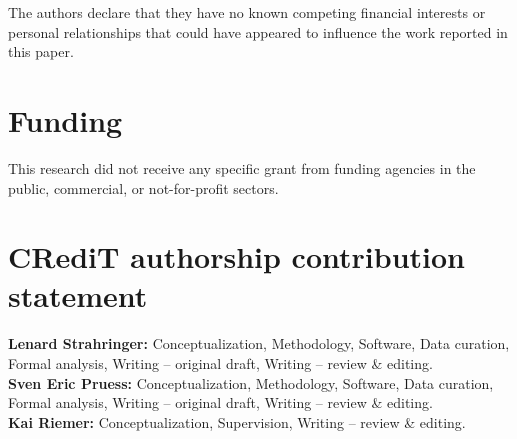 \documentclass[12pt]{article}
\begin{document}
The authors declare that they have no known competing financial interests or personal relationships that could have appeared to influence the work reported in this paper.

\section*{Funding}

This research did not receive any specific grant from funding agencies in the public, commercial, or not-for-profit sectors.

\section*{CRediT authorship contribution statement}

\textbf{Lenard Strahringer:} Conceptualization, Methodology, Software, Data curation, Formal analysis, Writing -- original draft, Writing -- review \& editing. \\
\textbf{Sven Eric Pruess:} Conceptualization, Methodology, Software, Data curation, Formal analysis, Writing -- original draft, Writing -- review \& editing. \\
\textbf{Kai Riemer:} Conceptualization, Supervision, Writing -- review \& editing.
\end{document}
